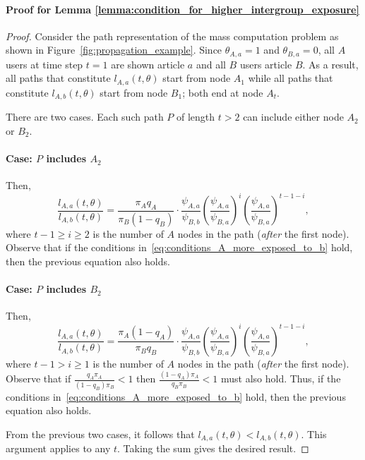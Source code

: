 \documentclass[letterpaper]{article} %
\begin{document}
\paragraph{Proof for Lemma \ref{lemma:condition_for_higher_intergroup_exposure}}
\begin{proof}
Consider the path representation of the mass computation problem as shown in Figure~\ref{fig:propagation_example}.
Since $\theta_{A,a} = 1$ and $\theta_{B,a}=0$, all $A$ users at time step $t=1$ are shown article $a$ and all $B$ users article $B$. 
As a result, all paths that constitute $l_{A,a}(t,\theta)$ start from node $A_1$ while all paths that constitute $l_{A,b}(t,\theta)$ start from node $B_1$; both end at node $A_t$.

There are two cases. Each such path $P$ of length $t>2$ can  include either  node $A_2$ or $B_2$. 

\paragraph{Case: $P$ includes $A_2$} Then,
\begin{equation*}
    \frac{l_{A,a}(t,\theta)}{l_{A,b}(t,\theta)} = \frac{\pi_A q_A}{\pi_B (1-q_B)} \cdot \frac{\psi_{A,a}}{\psi_{B,b}} \left(\frac{\psi_{A,a}}{\psi_{B,a}}\right)^i \left(\frac{\psi_{A,a}}{\psi_{B,a}}\right)^{t-1-i}, 
 \end{equation*}
where $t-1 \geq i\geq 2$ is the number of $A$ nodes in the path (\textit{after} the first node).
Observe that if the conditions in~\eqref{eq:conditions_A_more_exposed_to_b} hold, then the previous equation also holds. 
 
\paragraph{Case: $P$ includes $B_2$}
Then,
\begin{equation*}
    \frac{l_{A,a}(t,\theta)}{l_{A,b}(t,\theta)} = \frac{\pi_A (1-q_A)}{\pi_B q_B} \cdot \frac{\psi_{A,a}}{\psi_{B,b}} \left(\frac{\psi_{A,a}}{\psi_{B,a}}\right)^i \left(\frac{\psi_{A,a}}{\psi_{B,a}}\right)^{t-1-i}, 
 \end{equation*}
where $t-1>i\geq 1$ is the number of $A$ nodes in the path (\textit{after} the first node).
Observe that if $\frac{q_A \pi_A  }{(1-q_B) \pi_B} <1$ then $\frac{(1-q_A) \pi_A  }{q_B \pi_B} <1$ must also hold. 
Thus, if the conditions in~\eqref{eq:conditions_A_more_exposed_to_b} hold, then the previous equation also holds. 

From the previous two cases, it follows that $l_{A,a}(t,\theta) < l_{A,b}(t,\theta)$. This argument applies to any $t$. Taking the sum gives the desired result.
\end{proof} 
\end{document}
